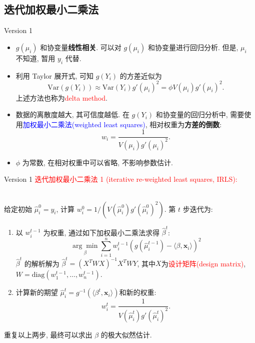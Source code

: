 \documentclass[professionalfont]{beamer}
\def\bx{\boldsymbol{x}}
\newcommand{\red}[1]{\textcolor{red}{#1}}
\newcommand{\blue}[1]{\textcolor{blue}{#1}}
\begin{document}
\subsection{迭代加权最小二乘法}
\begin{frame}{Version 1}
	\begin{itemize}
		\item $g(\mu_i)$ 和协变量\textbf{线性相关}. 可以对 $g(\mu_i)$ 和协变量进行回归分析. 但是, $\mu_i$ 不知道, 暂用 $y_i$ 代替.
		\item 利用 Taylor 展开式, 可知 $g(Y_i)$ 的方差近似为
		\begin{equation}\label{delta}
		\text{Var}(g(Y_i))\approx \text{Var}(Y_i)g'(\mu_i)^2=\phi V(\mu_i)g'(\mu_i)^2.
		\end{equation}
		上述方法也称为\red{delta method}.
		\item 数据的离散度越大, 其可信度越低. 在 $g(Y_i)$ 和协变量的回归分析中, 需要使用\blue{加权最小二乘法(weighted least squares)}, 相对权重为\textbf{方差的倒数}:
		$$w_i=\frac{1}{V(\mu_i)g'(\mu_i)^2}.$$
		\item $\phi$ 为常数, 在相对权重中可以省略, 不影响参数估计.
	\end{itemize}
\end{frame}
\begin{frame}{Version 1}
	\red{迭代加权最小二乘法 1 (iterative re-weighted least squares, IRLS):}\\
	
	~
	
	给定初始 $\hat{\mu}_i^0=y_i$, 计算 $w_i^0=1/(V(\hat{\mu}^0_i)g'(\hat{\mu}^0_i)^2)$. 第 $t$ 步迭代为:
	\begin{enumerate}
		\item 以 $w_i^{t-1}$ 为权重, 通过如下加权最小二乘法求得 $\hat{\beta}^t$: 
		$$\underset{\beta}{\arg\min}\sum_{i=1}^n w_i^{t-1}\left(g(\hat{\mu}_i^{t-1})-\langle\beta,\bx_i\rangle \right)^2$$
		$\hat{\beta}^t$ 的解析解为 $\hat{\beta}^t=(X^TWX)^{-1}X^TWY$, 其中$X$为\red{设计矩阵(design matrix)}, $W=\text{diag}(w^{t-1}_1,\ldots,w^{t-1}_n).$
		\item 计算新的期望 $\hat{\mu}_i^t=g^{-1}(\langle\beta^t,\bx_i\rangle)$和新的权重:
		$$w_i^t=\frac{1}{V(\hat{\mu}_i^t)g'(\hat{\mu}_i^t)^2}.$$
	\end{enumerate}
	重复以上两步, 最终可以求出 $\beta$ 的极大似然估计.
\end{frame}
\end{document}

